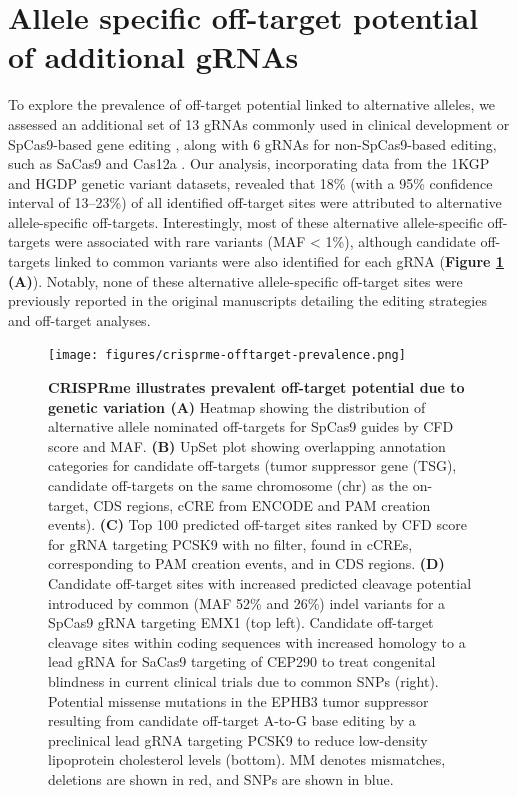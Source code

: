 \documentclass[a4paper, titlepage, openright]{book}
\newcommand{\crisprme}{CRISPRme\xspace}
\begin{document}
\section{Allele specific off-target potential of additional gRNAs}
To explore the prevalence of off-target potential linked to alternative alleles, we assessed an additional set of 13 gRNAs commonly used in clinical development or SpCas9-based gene editing \citep{xu2017crispr, xu2019crispr, stadtmauer2020crispr, gillmore2021crispr, dewitt2016selection, xu2019editing, metais2019genome, tsai2015guide, zeng2020therapeutic, musunuru2021vivo}, along with 6 gRNAs for non-SpCas9-based editing, such as SaCas9 and Cas12a \citep{xu2019editing, chu2021rationally, newby2021base, maeder2019development, de2019edit}. Our analysis, incorporating data from the 1KGP and HGDP genetic variant datasets, revealed that 18\% (with a 95\% confidence interval of 13–23\%) of all identified off-target sites were attributed to alternative allele-specific off-targets. Interestingly, most of these alternative allele-specific off-targets were associated with rare variants (MAF < 1\%), although candidate off-targets linked to common variants were also identified for each gRNA (\textbf{Figure \ref{fig:crisprme-offtarget-prevalence} (A)}). Notably, none of these alternative allele-specific off-target sites were previously reported in the original manuscripts detailing the editing strategies and off-target analyses.
%
\begin{figure}[!]
	\centering
	\texttt{[image: figures/crisprme-offtarget-prevalence.png]}
	\caption[\crisprme illustrates prevalent off-target potential due to genetic variation]{\textbf{\crisprme illustrates prevalent off-target potential due to genetic variation (A)} Heatmap showing the distribution of alternative allele nominated off-targets for SpCas9 guides by CFD score and MAF. \textbf{(B)} UpSet plot showing overlapping annotation categories for candidate off-targets (tumor suppressor gene (TSG), candidate off-targets on the same chromosome (chr) as the on-target, CDS regions, cCRE from ENCODE and PAM creation events). \textbf{(C)} Top 100 predicted off-target sites ranked by CFD score for gRNA targeting PCSK9 with no filter, found in cCREs, corresponding to PAM creation events, and in CDS regions. \textbf{(D)} Candidate off-target sites with increased predicted cleavage potential introduced by common (MAF 52\% and 26\%) indel variants for a SpCas9 gRNA targeting EMX1 (top left). Candidate off-target cleavage sites within coding sequences with increased homology to a lead gRNA for SaCas9 targeting of CEP290 to treat congenital blindness in current clinical trials due to common SNPs (right). Potential missense mutations in the EPHB3 tumor suppressor resulting from candidate off-target A-to-G base editing by a preclinical lead gRNA targeting PCSK9 to reduce low-density lipoprotein cholesterol levels (bottom). MM denotes mismatches, deletions are shown in red, and SNPs are shown in blue.}
	\label{fig:crisprme-offtarget-prevalence}
\end{figure}
\end{document}
